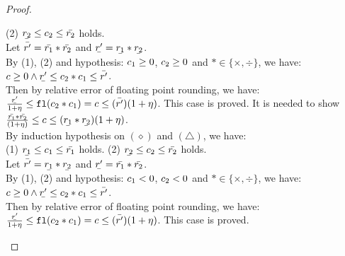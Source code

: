 \documentclass[a4paper,11pt]{article}
\begin{document}
\begin{proof}
\begin{itemize}
	(2) $\ubar{\rval_2} \leq \fval_2 \leq \bar{\rval_2}$ holds.\\
	Let $\bar{r'} = 
	\bar{r_1} * \bar{r_2}$ and 
	$\ubar{\rval'} = \ubar{\rval_1} * \ubar{\rval_2}$.
	\\
	By (1), (2) and hypothesis: $c_1 \geq 0$, $c_2 \geq 0$ and $* \in \{\times, \div\}$, we have:
	$\fval \geq 0
	\land
	\ubar{\rval'}
	\leq \fval_2 \bop \fval_1
	\leq \bar{\rval'}$.\\
	Then by relative error of floating point rounding, we have:\\
	$\frac{\ubar{\rval'}}{1 + \eta}
	\leq \floaten(\fval_2 \bop \fval_1) = \fval
	\leq (\bar{\rval'})(1 + \eta)$.
	This case is proved.
	\caseL{\[
		\inferrule*[right = bop-nn]
		{
			\trsenv, \expr_1 \trsto (\fval_1, (\ubar{\rval_1}, \bar{\rval_1}))
			~~~~
			\trsenv, \expr_2 \trsto (\fval_2, (\ubar{\rval_2}, \bar{\rval_2}))
			~~~~
			\fval_1 < 0
			~~~~
			\fval_2 < 0
			~~~~
			\fval = \floaten(\fval_1 * \fval_2)
			~~~~
			* \in \{\times, \div \}
		}
		{
		    \trsenv, \expr_1 * \expr_2
		    \trsto
		    \big(
		    \fval,
		    (\frac{\bar{\rval_1} * \bar{\rval_2}}{(1 + \eta)}, 
		        (\ubar{\rval_1} * \ubar{\rval_2})(1 + \eta))
		    \big)
		}
	\]}
	It is needed to show 
	$\frac{\bar{\rval_1} * \bar{\rval_2}}{(1 + \eta)}
	\leq \fval \leq 
	(\ubar{\rval_1} * \ubar{\rval_2})(1 + \eta)$.\\
	By induction hypothesis on $(\diamond)$ and $(\triangle)$, we have:\\
	(1) $\ubar{\rval_1} \leq \fval_1 \leq \bar{\rval_1}$ holds. 
	(2) $\ubar{\rval_2} \leq \fval_2 \leq \bar{\rval_2}$ holds.\\
	Let $\bar{\rval'} = 
	\ubar{\rval_1} * \ubar{\rval_2}$ and 
	$\ubar{\rval'} = \bar{\rval_1} * \bar{\rval_2}$.
	\\
	By (1), (2) and hypothesis: $c_1 < 0$, $c_2 < 0$ and $* \in \{\times, \div\}$, we have:
	$\fval \geq 0
	\land
	\ubar{\rval'}
	\leq \fval_2 \bop \fval_1
	\leq \bar{\rval'}$.\\
	Then by relative error of floating point rounding, we have:\\
	$\frac{\ubar{\rval'}}{1 + \eta}
	\leq \floaten(\fval_2 \bop \fval_1) = \fval
	\leq (\bar{\rval'})(1 + \eta)$.
	This case is proved.
\end{itemize}
\end{proof}
\end{document}
